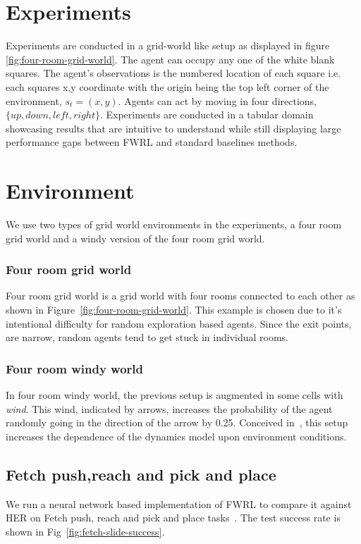 \section{Experiments}
\label{sec:experiments}

Experiments are conducted in a grid-world like setup as displayed in
figure \ref{fig:four-room-grid-world}. The agent can occupy any one of
the white blank squares. The agent's observations is the numbered
location of each square i.e. each squares x,y coordinate with the origin
being the top left corner of the environment, $s_t = (x, y)$. Agents
can act by moving in four  directions, $\{up, down, left, right\}$.
Experiments are conducted in a tabular domain showcasing results
that are intuitive to understand while still displaying large
performance gaps between FWRL and standard baselines methods. 

\section{Environment}
We use two types of grid world environments in the experiments, a four room grid
world and a windy version of the four room grid world.

\subsubsection{Four room grid world}
Four room grid world is a grid world with four rooms connected to each
other as shown in Figure~\ref{fig:four-room-grid-world}. This example is
chosen due to it's intentional difficulty for random exploration based
agents. Since the exit points, are narrow, random agents tend to get
stuck in individual rooms. 

\subsubsection{Four room windy world}
In four room windy world, the previous setup is augmented in some cells
with \emph{wind}. This wind, indicated by arrows, increases the
probability of the agent randomly going in the direction of the arrow by
0.25.  Conceived in~\citet{SuBaBOOK1998}, this setup increases the
dependence of the dynamics model upon environment conditions. 


\subsection{Fetch push,reach and pick and place}
We run a neural network based implementation of FWRL to compare it against HER
on Fetch push, reach and pick and place tasks~\citep{plappert201802multigoalrl}.
The test success rate is shown in Fig~\ref{fig:fetch-slide-success}. 

